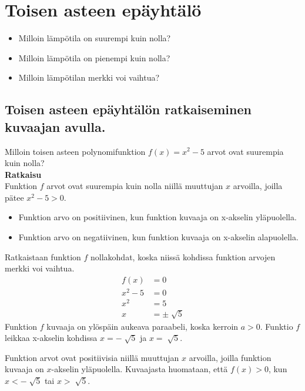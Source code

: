 \chapter{Toisen asteen epäyhtälö}
\begin{esimerkki}
\begin{itemize}
\item{Milloin lämpötila on suurempi kuin nolla?}
\item{Milloin lämpötila on pienempi kuin nolla?}
\item{Milloin lämpötilan merkki voi vaihtua?} 
\end{itemize}
\end{esimerkki}
\section{Toisen asteen epäyhtälön ratkaiseminen kuvaajan avulla.}
\begin{esimerkki}
Milloin toisen asteen polynomifunktion $f(x)=x^2-5$ arvot ovat suurempia kuin nolla?  \\
\textbf{Ratkaisu} \\
Funktion $f$ arvot ovat suurempia kuin nolla niillä muuttujan $x$ arvoilla, joilla pätee $x^2-5>0$. \\

\begin{itemize}
\item{Funktion arvo on positiivinen, kun funktion kuvaaja on x-akselin yläpuolella.}
\item{Funktion arvo on negatiivinen, kun funktion kuvaaja on x-akselin alapuolella.}
\end{itemize}
\begin{lukusuora}{-2.5}{2.5}{5}
\end{lukusuora}

Ratkaistaan funktion $f$ nollakohdat, koska niissä kohdissa funktion arvojen merkki voi vaihtua.
\begin{align*}
f(x)&=0 \\
x^2-5&=0 \\
x^2&=5 \\
x&=\pm \sqrt[]{5}
\end{align*}
Funktion $f$ kuvaaja on ylöspäin aukeava paraabeli, koska kerroin $a>0$.
Funktio $f$ leikkaa x-akselin kohdissa $x=-\sqrt[]{5}$ ja $x=\sqrt[]{5}$.

\begin{lukusuora}{-2.5}{2.5}{5}
\end{lukusuora}

Funktion arvot ovat positiivisia niillä muuttujan $x$ arvoilla, joilla funktion kuvaaja on $x$-akselin yläpuolella.
Kuvaajasta huomataan, että $f(x)>0$, kun $x<-\sqrt[]{5}$ tai $x>\sqrt[]{5}$. 
\end{esimerkki}
